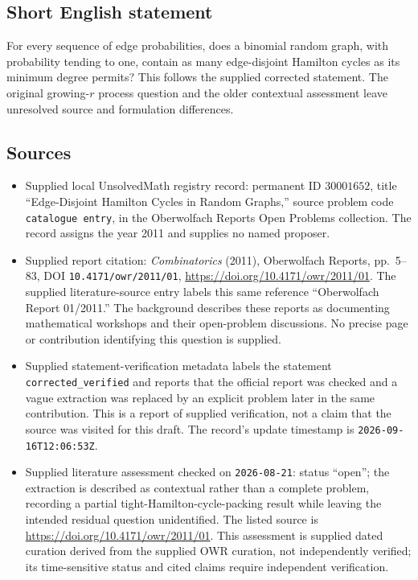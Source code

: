\documentclass[11pt]{article}
\begin{document}
\subsection{Short English statement}
For every sequence of edge probabilities, does a binomial random graph, with probability tending to one, contain as many edge-disjoint Hamilton cycles as its minimum degree permits? This follows the supplied corrected statement. The original growing-\(r\) process question and the older contextual assessment leave unresolved source and formulation differences.
\subsection{Sources}
\begin{itemize}
\item Supplied local UnsolvedMath registry record: permanent ID \(30001652\), title ``Edge-Disjoint Hamilton Cycles in Random Graphs,'' source problem code \texttt{catalogue entry}, in the Oberwolfach Reports Open Problems collection. The record assigns the year 2011 and supplies no named proposer.
\item Supplied report citation: \emph{Combinatorics} (2011), Oberwolfach Reports, pp.~5--83, DOI \texttt{10.4171/owr/2011/01}, \url{https://doi.org/10.4171/owr/2011/01}. The supplied literature-source entry labels this same reference ``Oberwolfach Report 01/2011.'' The background describes these reports as documenting mathematical workshops and their open-problem discussions. No precise page or contribution identifying this question is supplied.
\item Supplied statement-verification metadata labels the statement \texttt{corrected\_verified} and reports that the official report was checked and a vague extraction was replaced by an explicit problem later in the same contribution. This is a report of supplied verification, not a claim that the source was visited for this draft. The record's update timestamp is \texttt{2026-09-16T12:06:53Z}.
\item Supplied literature assessment checked on \texttt{2026-08-21}: status ``open''; the extraction is described as contextual rather than a complete problem, recording a partial tight-Hamilton-cycle-packing result while leaving the intended residual question unidentified. The listed source is \url{https://doi.org/10.4171/owr/2011/01}. This assessment is supplied dated curation derived from the supplied OWR curation, not independently verified; its time-sensitive status and cited claims require independent verification.
\end{itemize}
\end{document}
